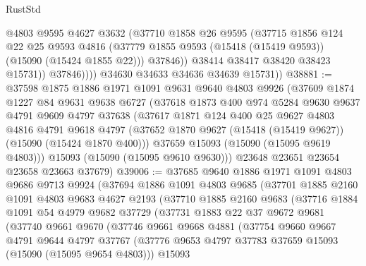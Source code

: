 \begin{lexlean}{RustStd}
\begin{coremodule}
                    @4803
                    @9595
                    @4627
                    @3632
                    (@37710
                      @1858
                      @26
                      @9595
                      (@37715
                        @1856
                        @124
                        @22
                        @25
                        @9593
                        @4816
                        (@37779 @1855 @9593 (@15418 (@15419 @9593)) (@15090 (@15424 @1855 @22)))
                        @37846))
                    @38414
                    @38417
                    @38420
                    @38423
                    @15731))
                @37846))))
        @34630
        @34633
        @34636
        @34639
        @15731))
@38881 := @37598
    @1875
    @1886
    @1971
    @1091
    @9631
    @9640
    @4803
    @9926
    (@37609
      @1874
      @1227
      @84
      @9631
      @9638
      @6727
      (@37618
        @1873
        @400
        @974
        @5284
        @9630
        @9637
        @4791
        @9609
        @4797
        @37638
        (@37617
          @1871
          @124
          @400
          @25
          @9627
          @4803
          @4816
          @4791
          @9618
          @4797
          (@37652 @1870 @9627 (@15418 (@15419 @9627)) (@15090 (@15424 @1870 @400)))
          @37659
          @15093
          (@15090 (@15095 @9619 @4803)))
        @15093
        (@15090 (@15095 @9610 @9630)))
      @23648
      @23651
      @23654
      @23658
      @23663
      @37679)
@39006 := @37685
    @9640
    @1886
    @1971
    @1091
    @4803
    @9686
    @9713
    @9924
    (@37694
      @1886
      @1091
      @4803
      @9685
      (@37701
        @1885
        @2160
        @1091
        @4803
        @9683
        @4627
        @2193
        (@37710
          @1885
          @2160
          @9683
          (@37716
            @1884
            @1091
            @54
            @4979
            @9682
            @37729
            (@37731
              @1883
              @22
              @37
              @9672
              @9681
              (@37740
                @9661
                @9670
                (@37746
                  @9661
                  @9668
                  @4881
                  (@37754
                    @9660
                    @9667
                    @4791
                    @9644
                    @4797
                    @37767
                    (@37776 @9653 @4797 @37783 @37659 @15093 (@15090 (@15095 @9654 @4803)))
                    @15093

\end{coremodule}
\end{lexlean}
